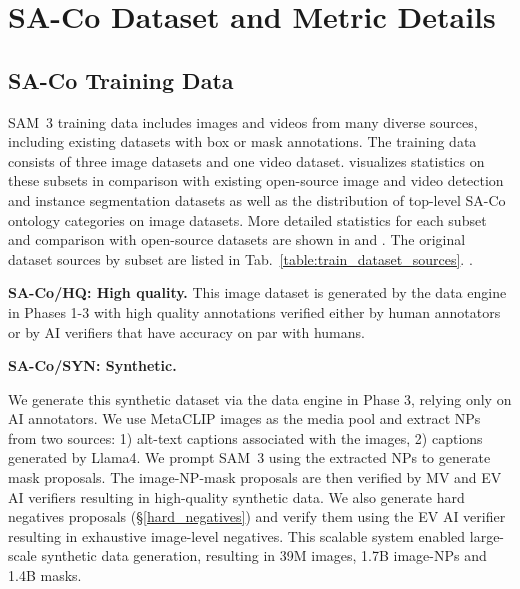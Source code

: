 \documentclass[]{fairmeta}
\newcommand{\model}{SAM~3\xspace}
\newcommand{\dsname}{{SA-Co}\xspace}
\newcommand{\trainhq}{{\dsname/HQ}\xspace}
\newcommand{\trainsyn}{{\dsname/SYN}\xspace}
\newcommand{\synimgs}{39M\xspace}
\newcommand{\synmasks}{1.4B\xspace}
\newcommand{\synimgnps}{1.7B\xspace}
\renewcommand{\paragraph}[1]{%
	\noindent\textbf{#1.}\noindent\xspace%
}
\begin{document}
\section{\dsname Dataset and Metric Details}\label{sec:data_details}




\subsection{\dsname Training Data}\label{sec:training_data_details}

\model training data includes images and videos from many diverse sources, including existing datasets with box or mask annotations. The training data consists of three image datasets and one video dataset.  visualizes statistics on these subsets in comparison with existing open-source image and video detection and instance segmentation datasets as well as the distribution of top-level \dsname ontology categories on image datasets. More detailed statistics for each subset and comparison with open-source datasets are shown in  and . The original dataset sources by subset are listed in Tab.~\ref{table:train_dataset_sources}. .

\paragraph{\trainhq: High quality} This image dataset is generated by the data engine in Phases 1-3 with high quality annotations verified either by human annotators or by AI verifiers that have accuracy on par with humans.

\paragraph{\trainsyn: Synthetic}
We generate this synthetic dataset via the data engine in Phase 3, relying only on AI annotators. We use MetaCLIP images as the media pool and extract NPs from two sources: 1) alt-text captions associated with the images, 2) captions generated by Llama4. We prompt \model using the extracted NPs to generate mask proposals. The image-NP-mask proposals are then verified by MV and EV AI verifiers resulting in high-quality synthetic data. We also generate hard negatives proposals (\S\ref{hard_negatives}) and verify them using the EV AI verifier resulting in exhaustive image-level negatives. This scalable system enabled large-scale synthetic data generation, resulting in \synimgs images, \synimgnps image-NPs and \synmasks masks. 
\end{document}

